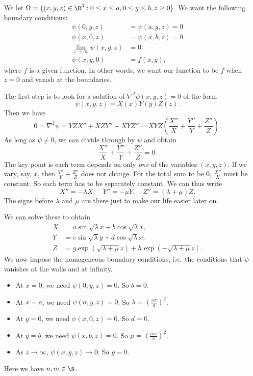 \documentclass[a4paper]{article}
\begin{document}
We let $\Omega = \{(x, y, z) \in \R^3: 0 \leq x \leq a, 0 \leq y \leq b, z \geq 0\}$. We want the following boundary conditions:
\begin{align*}
  \psi(0, y, z) &= \psi(a, y, z) = 0\\
  \psi(x, 0, z) &= \psi(x, b, z) = 0\\
  \lim_{z\to \infty} \psi(x, y, z) &= 0\\
  \psi(x, y, 0) &= f(x, y),
\end{align*}
where $f$ is a given function. In other words, we want our function to be $f$ when $z = 0$ and vanish at the boundaries.

The first step is to look for a solution of $\nabla^2 \psi(x, y, z) = 0$ of the form
\[
  \psi(x, y, z) = X(x)Y(y)Z(z).
\]
Then we have
\[
  0 = \nabla^2 \psi = YZX'' + XZY'' + XYZ'' = XYZ \left(\frac{X''}{X} + \frac{Y''}{Y} + \frac{Z''}{Z}\right).
\]
As long as $\psi \not= 0$, we can divide through by $\psi$ and obtain
\[
  \frac{X''}{X} + \frac{Y''}{Y} + \frac{Z''}{Z} = 0.
\]
The key point is each term depends on only \emph{one} of the variables $(x, y, z)$. If we vary, say, $x$, then $\frac{Y''}{Y} + \frac{Z''}{Z}$ does not change. For the total sum to be $0$, $\frac{X''}{X}$ must be constant. So each term has to be separately constant. We can thus write
\[
  X'' = -\lambda X,\quad Y'' = -\mu Y,\quad Z'' = (\lambda + \mu) Z.
\]
The signs before $\lambda$ and $\mu$ are there just to make our life easier later on.

We can solve these to obtain
\begin{align*}
  X &= a\sin \sqrt{\lambda} x + b \cos \sqrt{\lambda} x,\\
  Y &= c\sin \sqrt{\lambda} y + d \cos \sqrt{\lambda} x,\\
  Z &= g\exp(\sqrt{\lambda + \mu} z) + h\exp(-\sqrt{\lambda + \mu} z).
\end{align*}
We now impose the homogeneous boundary conditions, i.e.\ the conditions that $\psi$ vanishes at the walls and at infinity.
\begin{itemize}
  \item At $x = 0$, we need $\psi(0, y, z) = 0$. So $b = 0$.
  \item At $x = a$, we need $\psi(a, y, z) = 0$. So $\lambda = \left(\frac{n\pi}{a}\right)^2$.
  \item At $y = 0$, we need $\psi(x, 0, z) = 0$. So $d = 0$.
  \item At $y = b$, we need $\psi(x, b, z) = 0$. So $\mu = \left(\frac{m\pi}{b}\right)^2$.
  \item As $z \to \infty$, $\psi(x, y, z) \to 0$. So $g = 0$.
\end{itemize}
Here we have $n, m \in \N$.
\end{document}
